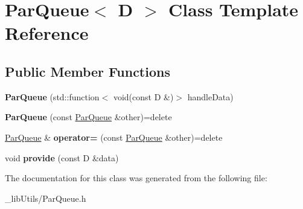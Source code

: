 \hypertarget{class_par_queue}{}\section{Par\+Queue$<$ D $>$ Class Template Reference}
\label{class_par_queue}
\subsection*{Public Member Functions}
\begin{DoxyCompactItemize}
\item 
{\bfseries Par\+Queue} (std\+::function$<$ void(const D \&)$>$ handle\+Data)\hypertarget{class_par_queue_a73a919e4b58f1220a6f3a52af625b616}{}\label{class_par_queue_a73a919e4b58f1220a6f3a52af625b616}

\item 
{\bfseries Par\+Queue} (const \hyperlink{class_par_queue}{Par\+Queue} \&other)=delete\hypertarget{class_par_queue_a4ea9ecbf02398dbf4862f07bf33b8504}{}\label{class_par_queue_a4ea9ecbf02398dbf4862f07bf33b8504}

\item 
\hyperlink{class_par_queue}{Par\+Queue} \& {\bfseries operator=} (const \hyperlink{class_par_queue}{Par\+Queue} \&other)=delete\hypertarget{class_par_queue_aedef197ecfe9a5625d8501b25b262504}{}\label{class_par_queue_aedef197ecfe9a5625d8501b25b262504}

\item 
void {\bfseries provide} (const D \&data)\hypertarget{class_par_queue_ae91d6ba584f537b85a8f1024d72128b5}{}\label{class_par_queue_ae91d6ba584f537b85a8f1024d72128b5}

\end{DoxyCompactItemize}


The documentation for this class was generated from the following file\+:\begin{DoxyCompactItemize}
\item 
\+\_\+lib\+Utils/Par\+Queue.\+h\end{DoxyCompactItemize}
